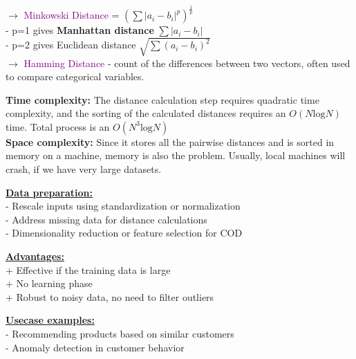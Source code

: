 \documentclass[letterpaper, 10.5pt,landscape]{article}
\begin{document}
\begin{multicols*}{3}
$\rightarrow$ \textcolor{purple}{Minkowski Distance} = \(\boxed{\left(\sum| a_{i} - b_{i}|^{p}\right)^{\frac{1}{p}}} \) \\
\hspace{10pt} - p=1 gives \textbf{Manhattan distance} \(\boxed{\sum|a_{i} - b_{i}|} \)  \\
\hspace{10pt} - p=2 gives Euclidean distance \(\boxed{\sqrt{\sum(a_{i} - b_{i})^{2}}} \)\\

\vspace{2pt}
$\rightarrow$ \textcolor{purple}{Hamming Distance} - count of the differences between two vectors, often used to compare categorical variables.




 
\textbf{Time complexity:}
The distance calculation step requires quadratic time complexity, and the sorting of the calculated distances requires an \(O(N \text{log} N)\) time. Total process is an \(O(N^{3} \text{log} N)\)  \\
\vspace{2pt}
\textbf{Space complexity:}
Since it stores all the pairwise distances and is sorted in memory on a machine, memory is also the problem. Usually, local machines will crash, if we have very large datasets.

 
 \vspace{3pt}
 \textbf{\underline{Data preparation:}} \\
- Rescale inputs using standardization or normalization \\
- Address missing data for distance calculations \\
- Dimensionality reduction or feature selection for COD


 \vspace{3pt}
 \textbf{\underline{Advantages:}} \\
+ Effective if the training data is large \\
+ No learning phase \\
+ Robust to noisy data, no need to filter outliers

 \vspace{3pt}
 \textbf{\underline{Usecase examples:}} \\
- Recommending products based on similar customers \\
- Anomaly detection in customer behavior




\vspace*{\fill}
\columnbreak



\end{multicols*}
\end{document}
